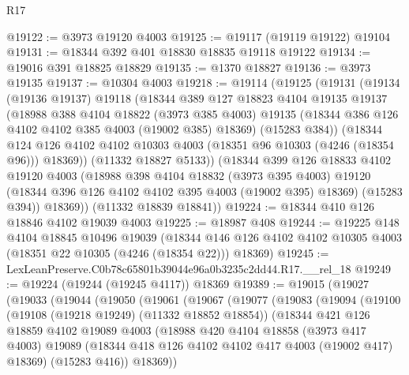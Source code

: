\begin{lexlean}{R17}
\begin{coremodule}
@19122 := @3973 @19120 @4003
@19125 := @19117 (@19119 @19122) @19104
@19131 := @18344 @392 @401 @18830 @18835 @19118 @19122
@19134 := @19016 @391 @18825 @18829
@19135 := @1370 @18827
@19136 := @3973 @19135
@19137 := @10304 @4003
@19218 := @19114
    (@19125
      (@19131
        (@19134
          (@19136 @19137)
          @19118
          (@18344
            @389
            @127
            @18823
            @4104
            @19135
            @19137
            (@18988
              @388
              @4104
              @18822
              (@3973 @385 @4003)
              @19135
              (@18344 @386 @126 @4102 @4102 @385 @4003 (@19002 @385) @18369)
              (@15283 @384))
            (@18344
              @124
              @126
              @4102
              @4102
              @10303
              @4003
              (@18351 @96 @10303 (@4246 (@18354 @96)))
              @18369))
          (@11332 @18827 @5133))
        (@18344
          @399
          @126
          @18833
          @4102
          @19120
          @4003
          (@18988
            @398
            @4104
            @18832
            (@3973 @395 @4003)
            @19120
            (@18344 @396 @126 @4102 @4102 @395 @4003 (@19002 @395) @18369)
            (@15283 @394))
          @18369))
      (@11332 @18839 @18841))
@19224 := @18344 @410 @126 @18846 @4102 @19039 @4003
@19225 := @18987 @408
@19244 := @19225
    @148
    @4104
    @18845
    @10496
    @19039
    (@18344 @146 @126 @4102 @4102 @10305 @4003 (@18351 @22 @10305 (@4246 (@18354 @22))) @18369)
@19245 := LexLeanPreserve.C0b78c65801b39044e96a0b3235c2dd44.R17.__rel_18
@19249 := @19224 (@19244 (@19245 @4117)) @18369
@19389 := @19015
    (@19027
      (@19033
        (@19044
          (@19050
            (@19061
              (@19067
                (@19077
                  (@19083
                    (@19094
                      (@19100
                        (@19108 (@19218 @19249) (@11332 @18852 @18854))
                        (@18344
                          @421
                          @126
                          @18859
                          @4102
                          @19089
                          @4003
                          (@18988
                            @420
                            @4104
                            @18858
                            (@3973 @417 @4003)
                            @19089
                            (@18344 @418 @126 @4102 @4102 @417 @4003 (@19002 @417) @18369)
                            (@15283 @416))
                          @18369))

\end{coremodule}
\end{lexlean}
